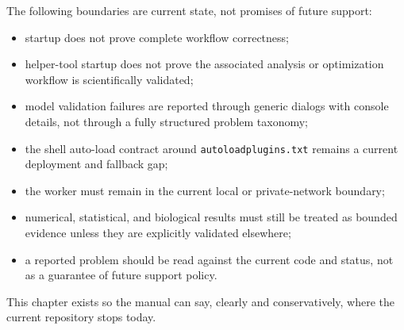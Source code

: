 The following boundaries are current state, not promises of future support:
\begin{itemize}
\item startup does not prove complete workflow correctness;
\item helper-tool startup does not prove the associated analysis or
optimization workflow is scientifically validated;
\item model validation failures are reported through generic dialogs with
console details, not through a fully structured problem taxonomy;
\item the shell auto-load contract around \texttt{autoloadplugins.txt} remains a
current deployment and fallback gap;
\item the worker must remain in the current local or private-network boundary;
\item numerical, statistical, and biological results must still be treated as
bounded evidence unless they are explicitly validated elsewhere;
\item a reported problem should be read against the current code and status,
not as a guarantee of future support policy.
\end{itemize}

This chapter exists so the manual can say, clearly and conservatively, where
the current repository stops today.
